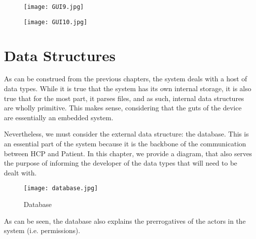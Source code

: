 \documentclass{scrreprt}
\begin{document}
\begin{figure}[h!]
    \centering
    \texttt{[image: GUI9.jpg]}
    \label{fig:gui9}
\end{figure}

\begin{figure}[h!]
    \centering
    \texttt{[image: GUI10.jpg]}
    \label{fig:gui10}
\end{figure}

\chapter{Data Structures}
As can be construed from the previous chapters, the system deals with a host of data types. While it is true that the system has its own internal storage, it is also true that for the most part, it parses files, and 
as such, internal data structures are wholly primitive. This makes sense, considering that the guts of the device are essentially an embedded system.

Nevertheless, we must consider the external data structure: the database. This is an essential part of the system because it is the backbone of the communication between HCP and Patient. In this chapter, we provide
a diagram, that also serves the purpose of informing the developer of the data types that will need to be dealt with.

\begin{figure}[h!]
    \centering
    \texttt{[image: database.jpg]}
    \caption{Database}
    \label{fig:database}
\end{figure}

As can be seen, the database also explains the prerrogatives of the actors in the system (i.e. permissions). 
\end{document}
